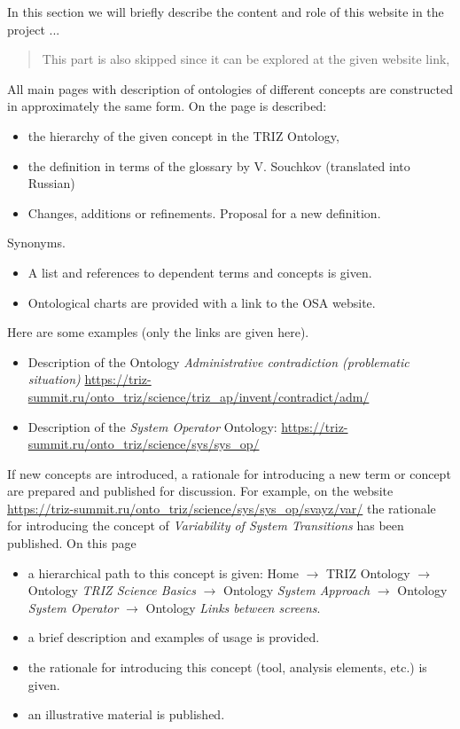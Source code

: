 \documentclass[11pt,a4paper]{article}
\begin{document}
In this section we will briefly describe the content and role of this website
in the project ...
\begin{quote}
  This part is also skipped since it can be explored at the given website
  link, 
\end{quote}
All main pages with description of ontologies of different concepts are
constructed in approximately the same form. On the page is described:
\begin{itemize}[noitemsep]
\item the hierarchy of the given concept in the TRIZ Ontology,
\item the definition in terms of the glossary by V. Souchkov (translated into
  Russian)
\item Changes, additions or refinements. Proposal for a new definition.
\end{itemize}
Synonyms.  
\begin{itemize}[noitemsep]
\item A list and references to dependent terms and concepts is given. 
\item Ontological charts are provided with a link to the OSA website.
\end{itemize}
Here are some examples (only the links are given here).
\begin{itemize}[noitemsep]
\item Description of the Ontology \emph{Administrative contradiction
  (problematic situation)}
  \url{https://triz-summit.ru/onto_triz/science/triz_ap/invent/contradict/adm/}
\item Description of the \emph{System Operator} Ontology:
  \url{https://triz-summit.ru/onto_triz/science/sys/sys_op/}
\end{itemize}
If new concepts are introduced, a rationale for introducing a new term or
concept are prepared and published for discussion. For example, on the website
\url{https://triz-summit.ru/onto_triz/science/sys/sys_op/svayz/var/} the
rationale for introducing the concept of \emph{Variability of System
  Transitions} has been published. On this page 
\begin{itemize}[noitemsep]
\item a hierarchical path to this concept is given: Home $\to$ TRIZ Ontology
  $\to$ Ontology \emph{TRIZ Science Basics} $\to$ Ontology \emph{System
  Approach} $\to$ Ontology \emph{System Operator} $\to$ Ontology \emph{Links
  between screens}.
\item a brief description and examples of usage is provided.
\item the rationale for introducing this concept (tool, analysis elements,
  etc.) is given.
\item an illustrative material is published.
\end{itemize}
\end{document}
